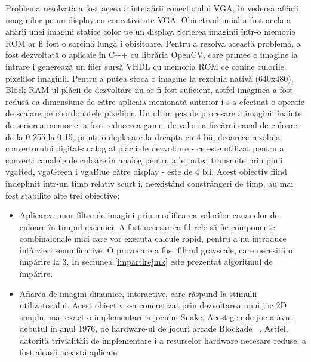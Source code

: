 \documentclass[a4paper,11pt,romanian]{article}
\begin{document}
{Problema rezolvat\u{a} a fost aceea a intefa\u{a}rii conectorului VGA, \^{i}n vederea afi\u{a}rii imaginilor pe un display cu conectivitate VGA.
Obiectivul iniial a fost acela a afi\u{a}rii unei imagini statice color pe un display.
Scrierea imaginii \^{i}ntr-o memorie ROM ar fi fost o sarcin\u{a} lung\u{a} i obisitoare. Pentru a rezolva aceast\u{a} problem\u{a}, a fost dezvoltat\u{a} o aplicaie \^{i}n C++ cu libr\u{a}ria OpenCV, care primee o imagine la intrare i genereaz\u{a} un fiier surs\u{a} VHDL cu memoria ROM ce conine culorile pixelilor imaginii.
Pentru a putea stoca o imagine la rezoluia nativ\u{a} (640x480), Block RAM-ul pl\u{a}cii de dezvoltare nu ar fi fost suficient, astfel imaginea a fost redus\u{a} ca dimensiune de c\u{a}tre aplicaia menionat\u{a} anterior i s-a efectuat o operaie de scalare pe coordonatele pixelilor.
Un ultim pas de procesare a imaginii \^{i}nainte de scrierea memoriei a fost reducerea gamei de valori a fiec\u{a}rui canal de culoare de la 0-255 la 0-15, printr-o deplasare la dreapta cu 4 bii, deoarece rezoluia convertorului digital-analog al pl\u{a}cii de dezvoltare - ce este utilizat pentru a converti canalele de culoare \^{i}n analog pentru a le putea transmite prin pinii vgaRed, vgaGreen i vgaBlue c\u{a}tre display - este de 4 bii. 
Acest obiectiv fiind \^{i}ndeplinit \^{i}ntr-un timp relativ scurt i, neexist\^{a}nd constr\^{a}ngeri de timp, au mai fost stabilite alte trei obiective:
\begin{itemize}
 \item Aplicarea unor filtre de imagini prin modificarea valorilor cananelor de culoare \^{i}n timpul execuiei.
 A fost necesar ca filtrele s\u{a} fie componente combinaionale mici care vor executa calcule rapid, pentru a nu introduce \^{i}nt\^{a}rzieri semnificative.
 O provocare a fost filtrul grayscale, care necesit\u{a} o \^{i}mp\u{a}rire la 3. \^{I}n seciunea \ref{impartirejmk} este prezentat algoritmul de \^{i}mp\u{a}rire.
 \item Afiarea de imagini dinamice, interactive, care r\u{a}spund la stimulii utilizatorului. Acest obiectiv s-a concretizat prin dezvoltarea unui joc 2D simplu, mai exact o implementare a jocului Snake. Acest gen de joc a avut debutul \^{i}n anul 1976, pe hardware-ul de jocuri arcade Blockade ~\cite{wiki:snake}. Astfel, datorit\u{a} trivialit\u{a}ii de implementare i a resurselor hardware necesare reduse, a fost aleas\u{a} aceast\u{a} aplicaie.

\end{itemize}}
\end{document}
